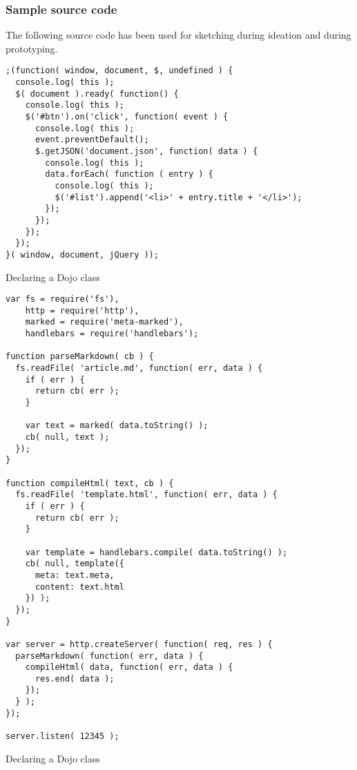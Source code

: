 \subsubsection*{Sample source code}
\label{app:diagram}
The following source code has been used for sketching during ideation and during prototyping.

\begin{listing}[H]
\begin{verbatim}
;(function( window, document, $, undefined ) {
  console.log( this );
  $( document ).ready( function() {
    console.log( this );
    $('#btn').on('click', function( event ) {
      console.log( this );
      event.preventDefault();
      $.getJSON('document.json', function( data ) {
        console.log( this );
        data.forEach( function ( entry ) {
          console.log( this );
          $('#list').append('<li>' + entry.title + '</li>');
        });
      });
    });
  });
}( window, document, jQuery ));
\end{verbatim}
\caption{Declaring a Dojo class}
\label{lst:classes}
\end{listing}

\begin{listing}[H]
\begin{verbatim}
var fs = require('fs'),
    http = require('http'),
    marked = require('meta-marked'),
    handlebars = require('handlebars');

function parseMarkdown( cb ) {
  fs.readFile( 'article.md', function( err, data ) {
    if ( err ) {
      return cb( err );
    }

    var text = marked( data.toString() );
    cb( null, text );
  });
}

function compileHtml( text, cb ) {
  fs.readFile( 'template.html', function( err, data ) {
    if ( err ) {
      return cb( err );
    }

    var template = handlebars.compile( data.toString() );
    cb( null, template({
      meta: text.meta,
      content: text.html
    }) );
  });
}

var server = http.createServer( function( req, res ) {
  parseMarkdown( function( err, data ) {
    compileHtml( data, function( err, data ) {
      res.end( data );
    });
  } );
});

server.listen( 12345 );
\end{verbatim}
\caption{Declaring a Dojo class}
\label{lst:classes}
\end{listing}
